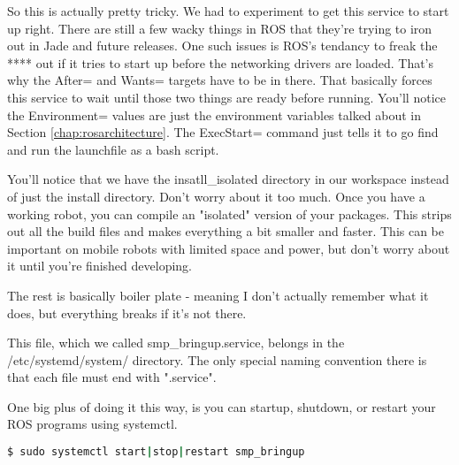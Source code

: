So this is actually pretty tricky. We had to experiment to get this service to start up right. There are still a few wacky things in ROS that they're trying to iron out in Jade and future releases. One such issues is ROS's tendancy to freak the **** out if it tries to start up before the networking drivers are loaded. That's why the After= and Wants= targets have to be in there. That basically forces this service to wait until those two things are ready before running. You'll notice the Environment= values are just the environment variables talked about in Section \ref{chap:rosarchitecture}. The ExecStart= command just tells it to go find and run the launchfile as a bash script.

You'll notice that we have the insatll\_isolated directory in our workspace instead of just the install directory. Don't worry about it too much. Once you have a working robot, you can compile an "isolated" version of your packages. This strips out all the build files and makes everything a bit smaller and faster. This can be important on mobile robots with limited space and power, but don't worry about it until you're finished developing.

The rest is basically boiler plate - meaning I don't actually remember what it does, but everything breaks if it's not there.

This file, which we called smp\_bringup.service, belongs in the /etc/systemd/system/ directory. The only special naming convention there is that each file must end with ".service".

One big plus of doing it this way, is you can startup, shutdown, or restart your ROS programs using systemctl.

\begin{lstlisting}[language=bash]
  $ sudo systemctl start|stop|restart smp_bringup
\end{lstlisting}